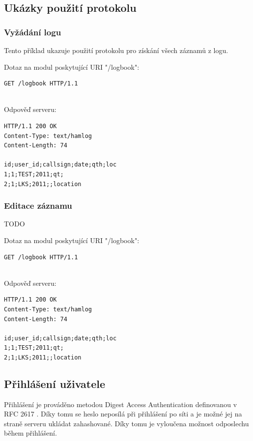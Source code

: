\subsection{Ukázky použití protokolu}

\subsubsection{Vyžádání logu}

Tento příklad ukazuje použití protokolu pro získání všech záznamů z logu.

Dotaz na modul poskytující URI "/logbook":
\begin{verbatim}
GET /logbook HTTP/1.1


\end{verbatim}
Odpověď serveru:
\begin{verbatim}
HTTP/1.1 200 OK
Content-Type: text/hamlog
Content-Length: 74

id;user_id;callsign;date;qth;loc
1;1;TEST;2011;qt;
2;1;LKS;2011;;location
\end{verbatim}

\subsubsection{Editace záznamu}

TODO

Dotaz na modul poskytující URI "/logbook":
\begin{verbatim}
GET /logbook HTTP/1.1


\end{verbatim}
Odpověď serveru:
\begin{verbatim}
HTTP/1.1 200 OK
Content-Type: text/hamlog
Content-Length: 74

id;user_id;callsign;date;qth;loc
1;1;TEST;2011;qt;
2;1;LKS;2011;;location
\end{verbatim}

\subsection{Přihlášení uživatele}

Přihlášení je prováděno metodou Digest Access Authentication definovanou v RFC 2617 \cite{rfc2617}. Díky tomu se heslo neposílá
při přihlášení po síti a je možné jej na straně serveru ukládat
zahashované. %
Díky tomu je vyloučena možnost odposlechu během přihlášení.

